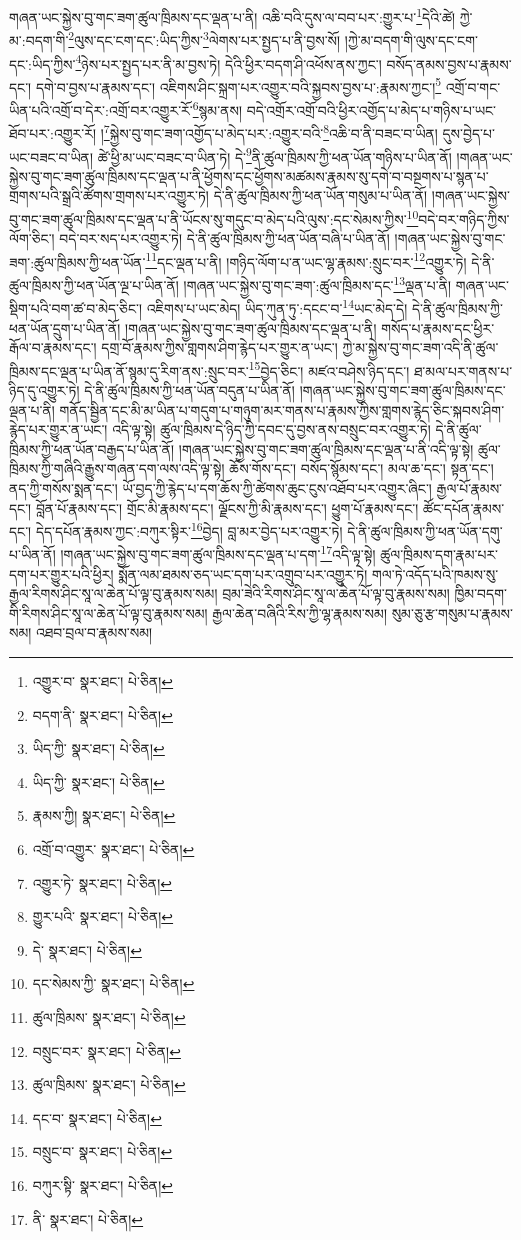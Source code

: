 གཞན་ཡང་སྐྱེས་བུ་གང་ཟག་ཚུལ་ཁྲིམས་དང་ལྡན་པ་ནི། འཆི་བའི་དུས་ལ་བབ་པར་:གྱུར་པ་\footnote{འགྱུར་བ་  སྣར་ཐང་།  པེ་ཅིན། }དེའི་ཚེ། ཀྱེ་མ་:བདག་གི་\footnote{བདག་ནི་  སྣར་ཐང་།  པེ་ཅིན། }ལུས་དང་ངག་དང་:ཡིད་ཀྱིས་\footnote{ཡིད་ཀྱི་  སྣར་ཐང་།  པེ་ཅིན། }ལེགས་པར་སྤྱད་པ་ནི་བྱས་སོ། །ཀྱེ་མ་བདག་གི་ལུས་དང་ངག་དང་:ཡིད་ཀྱིས་\footnote{ཡིད་ཀྱི་  སྣར་ཐང་།  པེ་ཅིན། }ཉེས་པར་སྤྱད་པར་ནི་མ་བྱས་ཏེ། དེའི་ཕྱིར་བདག་ཤི་འཕོས་ནས་ཀྱང་། བསོད་ནམས་བྱས་པ་རྣམས་དང་། དགེ་བ་བྱས་པ་རྣམས་དང་། འཇིགས་ཤིང་སྐྲག་པར་འགྱུར་བའི་སྐྱབས་བྱས་པ་:རྣམས་ཀྱང་།\footnote{རྣམས་ཀྱི།  སྣར་ཐང་།  པེ་ཅིན། } འགྲོ་བ་གང་ཡིན་པའི་འགྲོ་བ་དེར་:འགྲོ་བར་འགྱུར་རོ་\footnote{འགྲོ་བ་འགྱུར་  སྣར་ཐང་།  པེ་ཅིན། }སྙམ་ནས། བདེ་འགྲོར་འགྲོ་བའི་ཕྱིར་འགྱོད་པ་མེད་པ་གཉིས་པ་ཡང་ཐོབ་པར་:འགྱུར་རོ། །\footnote{འགྱུར་ཏེ་  སྣར་ཐང་།  པེ་ཅིན། }སྐྱེས་བུ་གང་ཟག་འགྱོད་པ་མེད་པར་:འགྱུར་བའི་\footnote{གྱུར་པའི་  སྣར་ཐང་།  པེ་ཅིན། }འཆི་བ་ནི་བཟང་བ་ཡིན། དུས་བྱེད་པ་ཡང་བཟང་བ་ཡིན། ཚེ་ཕྱི་མ་ཡང་བཟང་བ་ཡིན་ཏེ། དེ་\footnote{དེ་  སྣར་ཐང་།  པེ་ཅིན། }ནི་ཚུལ་ཁྲིམས་ཀྱི་ཕན་ཡོན་གཉིས་པ་ཡིན་ནོ། །གཞན་ཡང་སྐྱེས་བུ་གང་ཟག་ཚུལ་ཁྲིམས་དང་ལྡན་པ་ནི་ཕྱོགས་དང་ཕྱོགས་མཚམས་རྣམས་སུ་དགེ་བ་བསྔགས་པ་སྙན་པ་གྲགས་པའི་སྒྲའི་ཚོགས་གྲགས་པར་འགྱུར་ཏེ། དེ་ནི་ཚུལ་ཁྲིམས་ཀྱི་ཕན་ཡོན་གསུམ་པ་ཡིན་ནོ། །གཞན་ཡང་སྐྱེས་བུ་གང་ཟག་ཚུལ་ཁྲིམས་དང་ལྡན་པ་ནི་ཡོངས་སུ་གདུང་བ་མེད་པའི་ལུས་:དང་སེམས་ཀྱིས་\footnote{དང་སེམས་ཀྱི་  སྣར་ཐང་།  པེ་ཅིན། }བདེ་བར་གཉིད་ཀྱིས་ལོག་ཅིང་། བདེ་བར་སད་པར་འགྱུར་ཏེ། དེ་ནི་ཚུལ་ཁྲིམས་ཀྱི་ཕན་ཡོན་བཞི་པ་ཡིན་ནོ། །གཞན་ཡང་སྐྱེས་བུ་གང་ཟག་:ཚུལ་ཁྲིམས་ཀྱི་ཕན་ཡོན་\footnote{ཚུལ་ཁྲིམས་  སྣར་ཐང་།  པེ་ཅིན། }དང་ལྡན་པ་ནི། །གཉིད་ལོག་པ་ན་ཡང་ལྷ་རྣམས་:སྲུང་བར་\footnote{བསྲུང་བར་  སྣར་ཐང་།  པེ་ཅིན། }འགྱུར་ཏེ། དེ་ནི་ཚུལ་ཁྲིམས་ཀྱི་ཕན་ཡོན་ལྔ་པ་ཡིན་ནོ། །གཞན་ཡང་སྐྱེས་བུ་གང་ཟག་:ཚུལ་ཁྲིམས་དང་\footnote{ཚུལ་ཁྲིམས་  སྣར་ཐང་།  པེ་ཅིན། }ལྡན་པ་ནི། གཞན་ཡང་སྡིག་པའི་བག་ཚ་བ་མེད་ཅིང་། འཇིགས་པ་ཡང་མེད། ཡིད་ཀུན་ཏུ་:དངང་བ་\footnote{དང་བ་  སྣར་ཐང་།  པེ་ཅིན། }ཡང་མེད་དེ། དེ་ནི་ཚུལ་ཁྲིམས་ཀྱི་ཕན་ཡོན་དྲུག་པ་ཡིན་ནོ། །གཞན་ཡང་སྐྱེས་བུ་གང་ཟག་ཚུལ་ཁྲིམས་དང་ལྡན་པ་ནི། གསོད་པ་རྣམས་དང་ཕྱིར་རྒོལ་བ་རྣམས་དང་། དགྲ་བོ་རྣམས་ཀྱིས་གླགས་ཤིག་རྙེད་པར་གྱུར་ན་ཡང་། ཀྱེ་མ་སྐྱེས་བུ་གང་ཟག་འདི་ནི་ཚུལ་ཁྲིམས་དང་ལྡན་པ་ཡིན་ནོ་སྙམ་དུ་རིག་ནས་:སྲུང་བར་\footnote{བསྲུང་བ་  སྣར་ཐང་།  པེ་ཅིན། }བྱེད་ཅིང་། མཛའ་བཤེས་ཉིད་དང་། ཐ་མལ་པར་གནས་པ་ཉིད་དུ་འགྱུར་ཏེ། དེ་ནི་ཚུལ་ཁྲིམས་ཀྱི་ཕན་ཡོན་བདུན་པ་ཡིན་ནོ། །གཞན་ཡང་སྐྱེས་བུ་གང་ཟག་ཚུལ་ཁྲིམས་དང་ལྡན་པ་ནི། གནོད་སྦྱིན་དང་མི་མ་ཡིན་པ་གདུག་པ་གཉུག་མར་གནས་པ་རྣམས་ཀྱིས་གླགས་རྙེད་ཅིང་སྐབས་ཤིག་རྙེད་པར་གྱུར་ན་ཡང་། འདི་ལྟ་སྟེ། ཚུལ་ཁྲིམས་དེ་ཉིད་ཀྱི་དབང་དུ་བྱས་ནས་བསྲུང་བར་འགྱུར་ཏེ། དེ་ནི་ཚུལ་ཁྲིམས་ཀྱི་ཕན་ཡོན་བརྒྱད་པ་ཡིན་ནོ། །གཞན་ཡང་སྐྱེས་བུ་གང་ཟག་ཚུལ་ཁྲིམས་དང་ལྡན་པ་ནི་འདི་ལྟ་སྟེ། ཚུལ་ཁྲིམས་ཀྱི་གཞིའི་རྒྱུས་གཞན་དག་ལས་འདི་ལྟ་སྟེ། ཆོས་གོས་དང་། བསོད་སྙོམས་དང་། མལ་ཆ་དང་། སྟན་དང་། ནད་ཀྱི་གསོས་སྨན་དང་། ཡོ་བྱད་ཀྱི་རྙེད་པ་དག་ཆོས་ཀྱི་ཚེགས་ཆུང་ངུས་འཐོབ་པར་འགྱུར་ཞིང་། རྒྱལ་པོ་རྣམས་དང་། བློན་པོ་རྣམས་དང་། གྲོང་མི་རྣམས་དང་། ལྗོངས་ཀྱི་མི་རྣམས་དང་། ཕྱུག་པོ་རྣམས་དང་། ཚོང་དཔོན་རྣམས་དང་། དེད་དཔོན་རྣམས་ཀྱང་:བཀུར་སྟིར་\footnote{བཀུར་སྟི་  སྣར་ཐང་།  པེ་ཅིན། }བྱེད། བླ་མར་བྱེད་པར་འགྱུར་ཏེ། དེ་ནི་ཚུལ་ཁྲིམས་ཀྱི་ཕན་ཡོན་དགུ་པ་ཡིན་ནོ། །གཞན་ཡང་སྐྱེས་བུ་གང་ཟག་ཚུལ་ཁྲིམས་དང་ལྡན་པ་དག་\footnote{ནི་  སྣར་ཐང་།  པེ་ཅིན། }འདི་ལྟ་སྟེ། ཚུལ་ཁྲིམས་དག་རྣམ་པར་དག་པར་གྱུར་པའི་ཕྱིར། སྨོན་ལམ་ཐམས་ཅད་ཡང་དག་པར་འགྲུབ་པར་འགྱུར་ཏེ། གལ་ཏེ་འདོད་པའི་ཁམས་སུ་རྒྱལ་རིགས་ཤིང་སཱ་ལ་ཆེན་པོ་ལྟ་བུ་རྣམས་སམ། བྲམ་ཟེའི་རིགས་ཤིང་སཱ་ལ་ཆེན་པོ་ལྟ་བུ་རྣམས་སམ། ཁྱིམ་བདག་གི་རིགས་ཤིང་སཱ་ལ་ཆེན་པོ་ལྟ་བུ་རྣམས་སམ། རྒྱལ་ཆེན་བཞིའི་རིས་ཀྱི་ལྷ་རྣམས་སམ། སུམ་ཅུ་རྩ་གསུམ་པ་རྣམས་སམ། འཐབ་བྲལ་བ་རྣམས་སམ། 